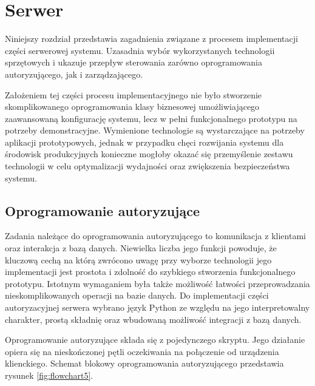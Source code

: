 \chapter{Serwer}
\label{chap:server}

    Niniejszy rozdział przedstawia zagadnienia związane z procesem implementacji części serwerowej systemu. Uzasadnia wybór wykorzystanych technologii sprzętowych i ukazuje przepływ sterowania zarówno oprogramowania autoryzującego, jak i zarządzającego.

    Założeniem tej części procesu implementacyjnego nie było stworzenie skomplikowanego oprogramowania klasy biznesowej umożliwiającego zaawansowaną konfigurację systemu, lecz w pełni funkcjonalnego prototypu na potrzeby demonstracyjne. Wymienione technologie są wystarczające na potrzeby aplikacji prototypowych, jednak w przypadku chęci rozwijania systemu dla środowisk produkcyjnych konieczne mogłoby okazać się przemyślenie zestawu technologii w celu optymalizacji wydajności oraz zwiększenia bezpieczeństwa systemu.

    \section{Oprogramowanie autoryzujące}
    \label{s:auth_subs}

    	Zadania należące do oprogramowania autoryzującego to komunikacja z klientami oraz interakcja z bazą danych. Niewielka liczba jego funkcji powoduje, że kluczową cechą na którą zwrócono uwagę przy wyborze technologii jego implementacji jest prostota i zdolność do szybkiego stworzenia funkcjonalnego prototypu. Istotnym wymaganiem była także możliwość łatwości przeprowadzania nieskomplikowanych operacji na bazie danych.
    	Do implementacji części autoryzacyjnej serwera wybrano język Python ze względu na jego interpretowalny charakter, prostą składnię oraz wbudowaną możliwość integracji z bazą danych. 

    	Oprogramowanie autoryzujące składa się z pojedynczego skryptu. Jego działanie opiera się na nieskończonej pętli oczekiwania na połączenie od urządzenia klienckiego. Schemat blokowy oprogramowania autoryzującego przedstawia rysunek \ref{fig:flowchart5}.

